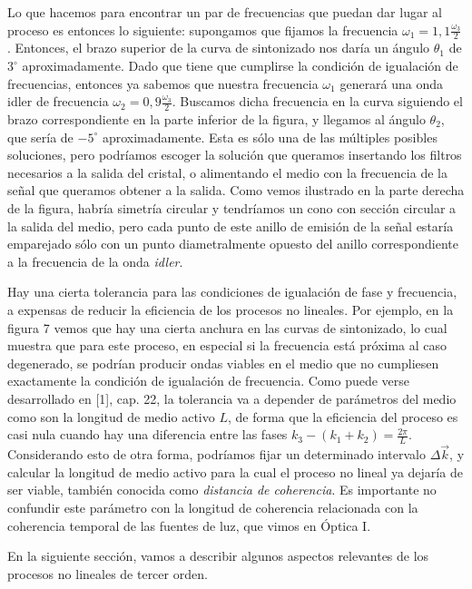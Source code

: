 \documentclass[12pt,a4paper]{report}
\newcommand{\esp}{\vspace{0.5cm}}
\begin{document}
	Lo que hacemos para encontrar un par de frecuencias que puedan dar lugar al proceso es entonces lo siguiente: supongamos que fijamos la frecuencia $\omega_1 = 1,1 \frac{\omega_3}{2}$. Entonces, el brazo superior de la curva de sintonizado nos daría un ángulo $\theta_1$ de $3^\circ$ aproximadamente. Dado que tiene que cumplirse la condición de igualación de frecuencias, entonces ya sabemos que nuestra frecuencia $\omega_1$ generará una onda idler de frecuencia $\omega_2 = 0,9 \frac{\omega_3}{2}$. Buscamos dicha frecuencia en la curva siguiendo el brazo correspondiente en la parte inferior de la figura, y llegamos al ángulo $\theta_2$, que sería de $-5^\circ$ aproximadamente. Esta es sólo una de las múltiples posibles soluciones, pero podríamos escoger la solución que queramos insertando los filtros necesarios a la salida del cristal, o alimentando el medio con la frecuencia de la señal que queramos obtener a la salida. Como vemos ilustrado en la parte derecha de la figura, habría simetría circular y tendríamos un cono con sección circular a la salida del medio, pero cada punto de este anillo de emisión de la señal estaría emparejado sólo con un punto diametralmente opuesto del anillo correspondiente a la frecuencia de la onda \textit{idler}.
	
	\esp
	
	Hay una cierta tolerancia para las condiciones de igualación de fase y frecuencia, a expensas de reducir la eficiencia de los procesos no lineales. Por ejemplo, en la figura 7 vemos que hay una cierta anchura en las curvas de sintonizado, lo cual muestra que para este proceso, en especial si la frecuencia está próxima al caso degenerado, se podrían producir ondas viables en el medio que no cumpliesen exactamente la condición de igualación de frecuencia. Como puede verse desarrollado en [1], cap. 22, la tolerancia va a depender de parámetros del medio como son la longitud de medio activo $L$, de forma que la eficiencia del proceso es casi nula cuando hay una diferencia entre las fases $k_3 - (k_1 + k_2) = \frac{2\pi}{L}$. Considerando esto de otra forma, podríamos fijar un determinado intervalo $\Delta \vec{k}$, y calcular la longitud de medio activo para la cual el proceso no lineal ya dejaría de ser viable, también conocida como \textit{distancia de coherencia}. Es importante no confundir este parámetro con la longitud de coherencia relacionada con la coherencia temporal de las fuentes de luz, que vimos en Óptica I.
	
	\esp
	
	En la siguiente sección, vamos a describir algunos aspectos relevantes de los procesos no lineales de tercer orden.
	
\end{document}
